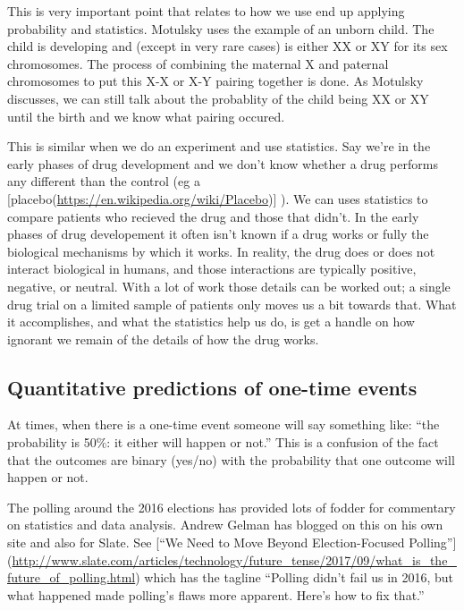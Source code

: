 \documentclass[]{book}
\theoremstyle{definition}
\theoremstyle{definition}
\theoremstyle{definition}
\theoremstyle{remark}
\begin{document}
This is very important point that relates to how we use end up applying
probability and statistics. Motulsky uses the example of an unborn
child. The child is developing and (except in very rare cases) is either
XX or XY for its sex chromosomes. The process of combining the maternal
X and paternal chromosomes to put this X-X or X-Y pairing together is
done. As Motulsky discusses, we can still talk about the probablity of
the child being XX or XY until the birth and we know what pairing
occured.

This is similar when we do an experiment and use statistics. Say we're
in the early phases of drug development and we don't know whether a drug
performs any different than the control (eg a
{[}placebo(\url{https://en.wikipedia.org/wiki/Placebo}){]} ). We can
uses statistics to compare patients who recieved the drug and those that
didn't. In the early phases of drug developement it often isn't known if
a drug works or fully the biological mechanisms by which it works. In
reality, the drug does or does not interact biological in humans, and
those interactions are typically positive, negative, or neutral. With a
lot of work those details can be worked out; a single drug trial on a
limited sample of patients only moves us a bit towards that. What it
accomplishes, and what the statistics help us do, is get a handle on how
ignorant we remain of the details of how the drug works.

\subsection{Quantitative predictions of one-time
events}\label{quantitative-predictions-of-one-time-events}

At times, when there is a one-time event someone will say something
like: ``the probability is 50\%: it either will happen or not.'' This is
a confusion of the fact that the outcomes are binary (yes/no) with the
probability that one outcome will happen or not.

The polling around the 2016 elections has provided lots of fodder for
commentary on statistics and data analysis. Andrew Gelman has blogged on
this on his own site and also for Slate. See {[}``We Need to Move Beyond
Election-Focused Polling''{]}
(\url{http://www.slate.com/articles/technology/future_tense/2017/09/what_is_the_future_of_polling.html})
which has the tagline ``Polling didn't fail us in 2016, but what
happened made polling's flaws more apparent. Here's how to fix that.''
\end{document}

